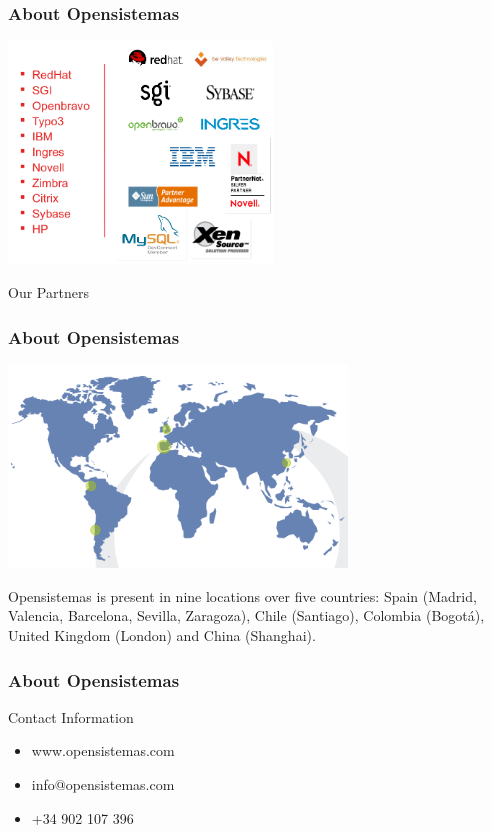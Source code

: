 \documentclass{beamer}
\begin{document}
\begin{frame}
\frametitle{About Opensistemas}
\begin{center}
\includegraphics[width=7cm]{figs/opensistemas-partners}
\end{center}
\begin{center}
Our Partners
\end{center}
\end{frame}

\begin{frame}

\frametitle{About Opensistemas}
\begin{center}
\includegraphics[width=9cm]{figs/opensistemas-worldmap}
\end{center}
\begin{center}
{\small Opensistemas is present in nine locations over five countries: Spain (Madrid, Valencia, Barcelona, Sevilla, Zaragoza), Chile (Santiago), Colombia (Bogotá), United Kingdom (London) and China (Shanghai).}
\end{center}
\end{frame}

\begin{frame}

\frametitle{About Opensistemas}
{\Huge Contact Information}
\begin{itemize}
\item www.opensistemas.com
\item info@opensistemas.com
\item +34 902 107 396
\end{itemize}
\end{frame}
\end{document}

